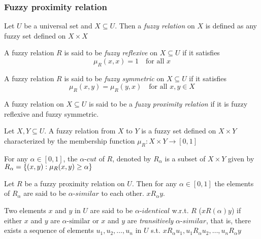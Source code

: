\documentclass[11pt]{article}
\begin{document}
\subsubsection{Fuzzy proximity relation}
\label{sec:org05982b2}
\begin{definition}[]
Let \(U\) be a universal set and \(X\subseteq U\). Then a \emph{fuzzy relation} on \(X\)
is defined as any fuzzy set defined on \(X\times X\)
\end{definition}
\begin{definition}[]
A fuzzy relation \(R\) is said to be \emph{fuzzy reflexive} on \(X\subseteq U\) if it
satisfies
\begin{equation*}
\mu_R(x,x)=1\quad\text{for all } x
\end{equation*}
\end{definition}
\begin{definition}[]
A fuzzy relation \(R\) is said to be \emph{fuzzy symmetric} on \(X\subseteq U\) if it
satisfies
\begin{equation*}
\mu_R(x,y)=\mu_R(y,x)\quad\text{for all } x,y\in X
\end{equation*}
\end{definition}
\begin{definition}[]
A fuzzy relation on \(X\subseteq U\) is said to be a \emph{fuzzy proximity relation}
if it is fuzzy reflexive and fuzzy symmetric.
\end{definition}
\begin{definition}[]
Let \(X,Y\subseteq U\). A fuzzy relation from \(X\) to \(Y\) is a fuzzy set
defined on \(X\times Y\) characterized by the membership function \(\mu_R:X\times Y\to
    [0,1]\) 
\end{definition}
\begin{definition}[]
For any \(\alpha\in [0,1]\), the \(\alpha\textit{-cut}\) of \(R\), denoted by \(R_\alpha\) is a subset
of \(X\times Y\) given by \(R_\alpha=\left\{(x,y):\mu_R(x,y)\ge\alpha\right\}\)
\end{definition}
Let \(R\) be a fuzzy proximity relation on \(U\). Then for any \(\alpha\in [0,1]\) the
elements of \(R_\alpha\) are said to be \(\alpha\textit{-similar}\) to each
other. \(xR_\alpha y\). 

Two elements \(x\) and \(y\) in \(U\) are said to be \(\alpha\textit{-identical}\)
w.r.t. \(R\) (\(xR(\alpha)y\)) if either \(x\) and \(y\) are \(\alpha\text{-similar}\) or \(x\)
and \(y\) are \emph{transitively} \(\alpha\textit{-similar}\), that is, there exists a
sequence of elements \(u_1, u_2, \dots,u_n\) in \(U\) s.t. \linebreak
\(xR_\alpha u_1, u_1 R_\alpha u_2
    ,\dots,u_n R_\alpha y\)
\end{document}
